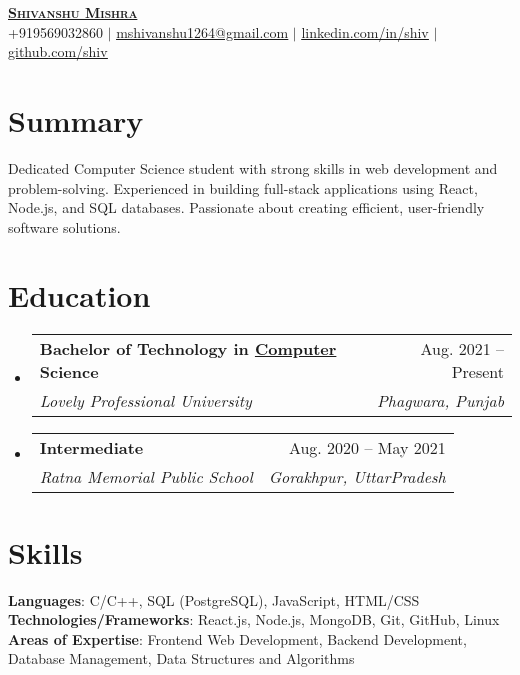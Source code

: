 \documentclass[letterpaper,11pt]{article}
\makeatletter
\newcommand{\resumeSubheading}[4]{
  \vspace{-2pt}\item
    \begin{tabular*}{0.97\textwidth}[t]{l@{\extracolsep{\fill}}r}
      \textbf{#1} & #2 \\
      \textit{\small#3} & \textit{\small #4} \\
    \end{tabular*}\vspace{-7pt}
}
\newcommand{\resumeSubHeadingListStart}{\begin{itemize}[leftmargin=0.15in, label={}]}
\newcommand{\resumeSubHeadingListEnd}{\end{itemize}}
\makeatother
\begin{document}
\begin{center}
	\textbf{\Huge \scshape \href{https://shivanshuportf.netlify.app/}{Shivanshu Mishra}} \\ \vspace{1pt}
	\small +919569032860 $|$ \href{mailto:mshivanshu1264@gmail.com}{\underline{mshivanshu1264@gmail.com}} $|$
	\href{https://linkedin.com/in/shivanshu-}{\underline{linkedin.com/in/shiv}} $|$
	\href{https://github.com/Ryomensukuna2003}{\underline{github.com/shiv}}
\end{center}


\section{Summary}
\small{Dedicated Computer Science student with strong skills in web development and problem-solving. Experienced in building full-stack applications using React, Node.js, and SQL databases. Passionate about creating efficient, user-friendly software solutions.}




\section{Education}
\resumeSubHeadingListStart
\resumeSubheading
{Bachelor of Technology in \href{}{Computer} Science}{Aug. 2021 -- Present}
{Lovely Professional University}{Phagwara, Punjab}
\resumeSubheading
{Intermediate}{Aug. 2020 -- May 2021}
{Ratna Memorial Public School}{Gorakhpur, UttarPradesh}
\resumeSubHeadingListEnd




\section{Skills}
\begin{itemize}[leftmargin=0.15in, label={}]
	\small{\item{
		            \textbf{Languages}{: C/C++, SQL (PostgreSQL), JavaScript, HTML/CSS} \\
		            \textbf{Technologies/Frameworks}{: React.js, Node.js, MongoDB, Git, GitHub, Linux} \\
		            \textbf{Areas of Expertise}{: Frontend Web Development, Backend Development, Database Management, Data Structures and Algorithms}
		      }}
\end{itemize}
\end{document}
